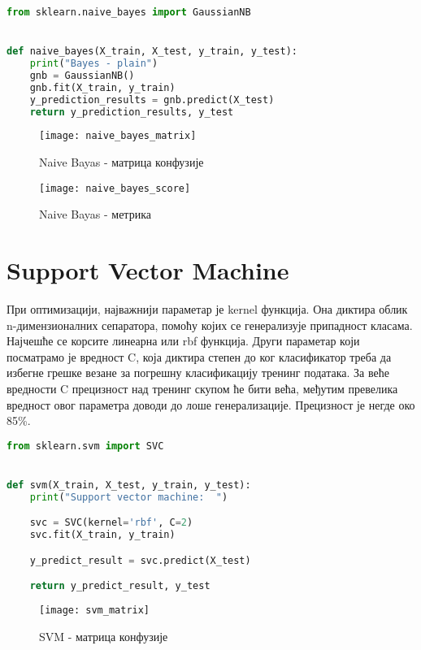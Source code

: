 \documentclass[11pt]{article} %
\begin{document}
\begin{lstlisting}[language=Python,title=Пример 7. ]
from sklearn.naive_bayes import GaussianNB


def naive_bayes(X_train, X_test, y_train, y_test):
    print("Bayes - plain")
    gnb = GaussianNB()
    gnb.fit(X_train, y_train)
    y_prediction_results = gnb.predict(X_test)
    return y_prediction_results, y_test
\end{lstlisting}

\begin{figure}[h]
\centering
	\texttt{[image: naive\_bayes\_matrix]} 
	\caption{Naive Bayas - матрица конфузије} 
\end{figure}

\begin{figure}[h]
\centering
	\texttt{[image: naive\_bayes\_score]} 
	\caption{Naive Bayas - метрика} 
\end{figure}


\section{Support Vector Machine}
При оптимизацији, најважнији параметар је kernel функција. Она диктира облик n-димензионалних сепаратора, помоћу којих се генерализује припадност класама. Најчешће се корсите линеарна или rbf функција. Други параметар који посматрамо је вредност C, која диктира степен до ког класификатор треба да избегне грешке везане за погрешну класификацију тренинг података. За веће вредности C прецизност над тренинг скупом ће бити већа, међутим превелика вредност овог параметра доводи до лоше генерализације.
	Прецизност је негде око 85\%.


\begin{lstlisting}[language=Python,title=Пример 8. /classifers/svm.py]
from sklearn.svm import SVC


def svm(X_train, X_test, y_train, y_test):
    print("Support vector machine:  ")

    svc = SVC(kernel='rbf', C=2)
    svc.fit(X_train, y_train)

    y_predict_result = svc.predict(X_test)

    return y_predict_result, y_test
\end{lstlisting}

\begin{figure}[h]
\centering
	\texttt{[image: svm\_matrix]} 
	\caption{SVM - матрица конфузије} 
\end{figure}
\end{document}
